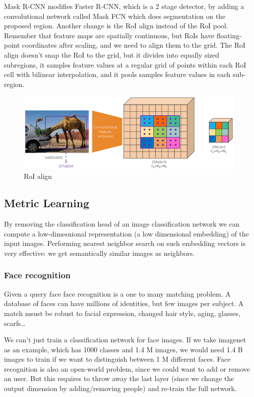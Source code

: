 Mask R-CNN modifies Faster R-CNN, which is a 2 stage detector, by adding a convolutional network called Mask FCN which does segmentation on the proposed region.
Another change is the RoI align instead of the RoI pool.
Remember that feature maps are spatially continuous, but RoIs have floating-point coordinates after scaling, and we need to align them to the grid.
The RoI align doesn't snap the RoI to the grid, but it divides into equally sized subregions, it samples feature values at a regular grid of points within each RoI cell with bilinear interpolation, and it pools samples feature values in each sub-region.

\begin{figure}[htbp]
  \centering
  \includegraphics[width=0.7\linewidth]{./img/roi_align.png}
  \caption{RoI align}
\end{figure}

\subsection{Metric Learning}

By removing the classification head of an image classification network we can compute a low-dimesnional representation (a low dimensional embedding) of the input images.
Performing nearest neighbor search on such embedding vectors is very effective: we get semantically similar images as neighbors.

\subsubsection{Face recognition}
Given a query face face recognition is a one to many matching problem.
A database of faces can have millions of identities, but few images per subject.
A match msust be robust to facial expression, changed hair style, aging, glasses, scarfs\dots

We can't just train a classification network for face images.
If we take imagenet as an example, which has 1000 classes and 1.4 M images, we would need 1.4 B images to train if we want to distinguish between 1 M different faces.
Face recognition is also an open-world problem, since we could want to add or remove an user.
But this requires to throw away the last layer (since we change the output dimension by adding/removing people) and re-train the full network.

